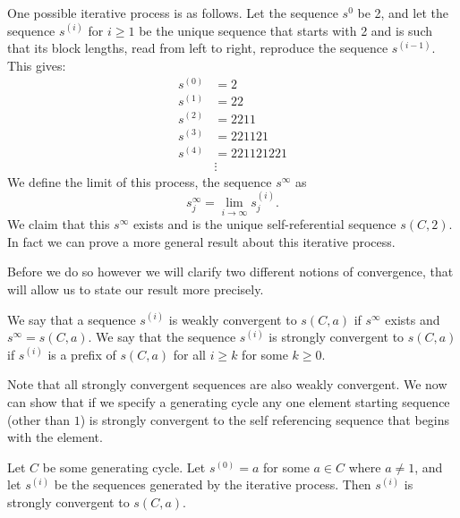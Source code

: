 \documentclass[runningheads,a4paper]{llncs}
\begin{document}
One possible iterative process is as follows. Let the sequence $s^0$ be 2, and let the sequence $s^{(i)}$ for $i \geq 1$ be the unique sequence that starts with 2 and is such that its block lengths, read from left to right, reproduce the sequence $s^{(i-1)}$. This gives:
\begin{align*}
s^{(0)}&= 2\\
s^{(1)} &= 22\\
s^{(2)} &= 2211\\
s^{(3)}&= 221121\\
s^{(4)} &= 221121221\\
&\vdots
\end{align*}
We define the limit of this process, the sequence $s^{\infty}$ as 
\begin{equation*}
s_{j}^{\infty} = \lim_{i \rightarrow \infty} s_{j}^{(i)}.
\end{equation*}
We claim that this $s^{\infty}$ exists and is the unique self-referential sequence $s(C,2)$. In fact we can prove a more general result about this iterative process.

Before we do so however we will clarify two different notions of convergence, that will allow us to state our result more precisely. 
\begin{definition} We say that a sequence $s^{(i)}$ is weakly convergent to $s(C,a)$ if $s^{\infty}$ exists and $s^{\infty} = s(C,a)$. We say that the sequence $s^{(i)}$ is strongly convergent to $s(C,a)$ if $s^{(i)}$ is a prefix of $s(C,a)$ for all $i \geq k$ for some $k\geq 0$. 
\end{definition}
Note that all strongly convergent sequences are also weakly convergent. We now can show that if we specify a generating cycle any one element starting sequence (other than $1$) is strongly convergent to the self referencing sequence that begins with the element.

\begin{theorem}
\label{iteratetheorem}
Let $C$ be some generating cycle. Let $s^{(0)} = a$ for some $a \in C$ where $a \neq 1$, and let $s^{(i)}$ be the sequences generated by the iterative process. Then $s^{(i)}$ is strongly convergent to $s(C,a)$.
\end{theorem}
\end{document}
